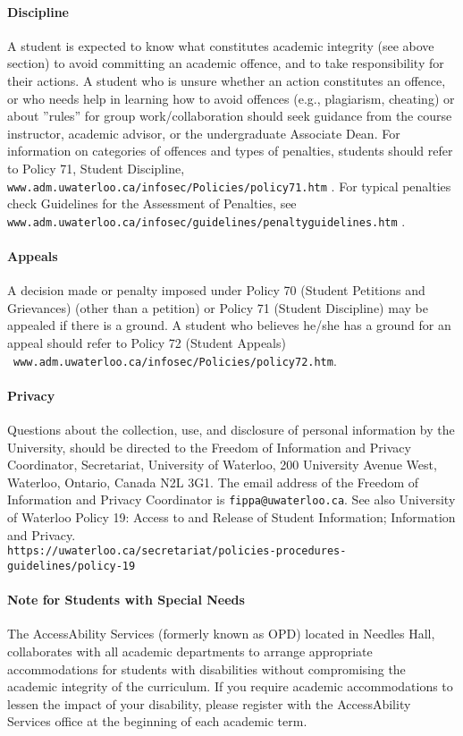 \documentclass[letterpaper,10pt]{article}
\begin{document}
\paragraph{Discipline}
A student is expected to know what constitutes academic integrity (see above section) to avoid committing an academic offence, and to take responsibility for their actions. A student who is unsure whether an action constitutes an offence, or who needs help in learning how to avoid offences (e.g., plagiarism, cheating) or about ''rules'' for group work/collaboration should seek guidance from the course instructor, academic advisor, or the undergraduate Associate Dean. For information on categories of offences and types of penalties, students should refer to Policy 71, Student Discipline, \texttt{www.adm.uwaterloo.ca/infosec/Policies/policy71.htm} . For typical penalties check Guidelines for the Assessment of Penalties, see \\\texttt{www.adm.uwaterloo.ca/infosec/guidelines/penaltyguidelines.htm} .

\paragraph{Appeals}
A decision made or penalty imposed under Policy 70 (Student Petitions and Grievances) (other than a petition) or Policy 71 (Student Discipline) may be appealed if there is a ground. A student who believes he/she has a ground for an appeal should refer to Policy 72 (Student Appeals)\\~\texttt{www.adm.uwaterloo.ca/infosec/Policies/policy72.htm}.

\paragraph{Privacy}
Questions about the collection, use, and disclosure of personal information by the University, should be directed to the Freedom of Information and Privacy Coordinator, Secretariat, University of Waterloo, 200 University Avenue West, Waterloo, Ontario, Canada N2L 3G1. The email address of the Freedom of Information and Privacy Coordinator is \texttt{fippa@uwaterloo.ca}. See also University of Waterloo Policy 19: Access to and Release of Student Information; Information and Privacy.
\\ \texttt{https://uwaterloo.ca/secretariat/policies-procedures-guidelines/policy-19}

\paragraph{Note for Students with Special Needs}
The AccessAbility Services (formerly known as OPD) located in Needles Hall, collaborates with all academic departments to arrange appropriate accommodations for students with disabilities without compromising the academic integrity of the curriculum. If you require academic accommodations to lessen the impact of your disability, please register with the AccessAbility Services office at the beginning of each academic term.
\end{document}
